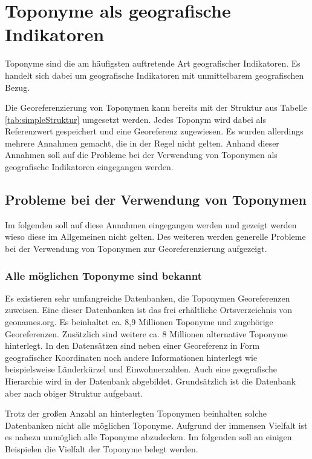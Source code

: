 	\section{Toponyme als geografische Indikatoren} \label{sec:topGeogInd}  

		Toponyme sind die am häufigsten auftretende Art geografischer Indikatoren. 
		Es handelt sich dabei um geografische Indikatoren mit unmittelbarem geografischen Bezug.

		Die Georeferenzierung von Toponymen kann bereits mit der Struktur aus Tabelle \ref{tab:simpleStruktur} umgesetzt werden. 
		Jedes Toponym wird dabei als Referenzwert gespeichert und eine Georeferenz zugewiesen.
		Es wurden allerdings mehrere Annahmen gemacht, die in der Regel nicht gelten.
		Anhand dieser Annahmen soll auf die Probleme bei der Verwendung von Toponymen als geografische Indikatoren eingegangen werden. 

		\subsection{Probleme bei der Verwendung von Toponymen} 

			Im folgenden soll auf diese Annahmen eingegangen werden und gezeigt werden wieso diese im Allgemeinen nicht gelten.
			Des weiteren werden generelle Probleme bei der Verwendung von Toponymen zur Georeferenzierung aufgezeigt.

			\subsubsection{Alle möglichen Toponyme sind bekannt}

				Es existieren sehr umfangreiche Datenbanken, die Toponymen Georeferenzen zuweisen.
				Eine dieser Datenbanken ist das frei erhältliche Ortsverzeichnis von geonames.org.
				Es beinhaltet ca. 8,9 Millionen Toponyme und zugehörige Georeferenzen.
				Zusätzlich sind weitere ca. 8 Millionen alternative Toponyme hinterlegt.
				In den Datensätzen sind neben einer Georeferenz in Form geografischer Koordinaten noch andere Informationen hinterlegt wie beispielsweise Länderkürzel und Einwohnerzahlen. 
				Auch eine geografische Hierarchie wird in der Datenbank abgebildet.
				Grundsätzlich ist die Datenbank aber nach obiger Struktur aufgebaut.

				Trotz der großen Anzahl an hinterlegten Toponymen beinhalten solche Datenbanken nicht alle möglichen Toponyme.
				Aufgrund der immensen Vielfalt ist es nahezu unmöglich alle Toponyme abzudecken. 
				Im folgenden soll an einigen Beispielen die Vielfalt der Toponyme belegt werden.

